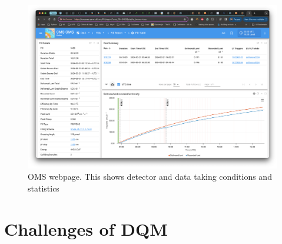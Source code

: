 \begin{figure}
	\includegraphics*[width=1\linewidth,trim = .8in 1.1in .9in 2.19in]{Images/OMS.png}
	\caption{OMS webpage. This shows detector and data taking conditions and statistics}
	\label{fig:OMS}
\end{figure}


\section{Challenges of DQM}

